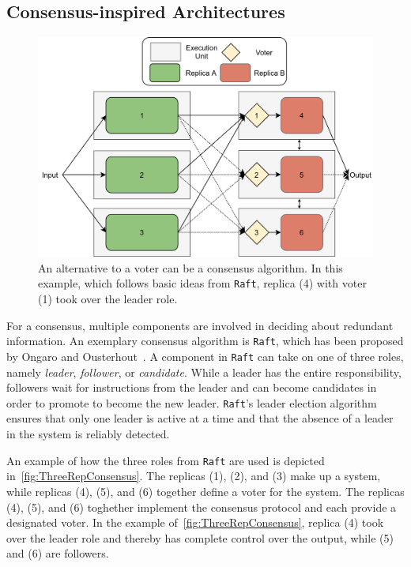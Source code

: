 \subsection{Consensus-inspired Architectures}
\label{subsec:consensusArchitecture}
\begin{figure}[!hb]
	\centering
	\includegraphics[width=0.75\linewidth]{images/ThreeComponentConsensus}
	\caption{An alternative to a voter can be a consensus algorithm. In this example, which follows basic ideas from \texttt{Raft}, replica (4) with voter (1) took over the leader role.}
	\label{fig:ThreeRepConsensus}
\end{figure}

For a consensus, multiple components are involved in deciding about redundant information.
An exemplary consensus algorithm is \texttt{Raft}, which has been proposed by Ongaro and Ousterhout~\cite{RaftConsensusPaper}.
A component in \texttt{Raft} can take on one of three roles, namely \textit{leader}, \textit{follower}, or \textit{candidate}.
While a leader has the entire responsibility, followers wait for instructions from the leader and can become candidates in order to promote to become the new leader.
\texttt{Raft}'s leader election algorithm ensures that only one leader is active at a time and that the absence of a leader in the system is reliably detected.

An example of how the three roles from \texttt{Raft} are used is depicted in~\autoref{fig:ThreeRepConsensus}.
The replicas (1), (2), and (3) make up a  system, while replicas (4), (5), and (6) together define a voter for the system.
The replicas (4), (5), and (6) toghether implement the consensus protocol and each provide a designated voter.
In the example of~\autoref{fig:ThreeRepConsensus}, replica (4) took over the leader role and thereby has complete control over the output, while (5) and (6) are followers.
\\

